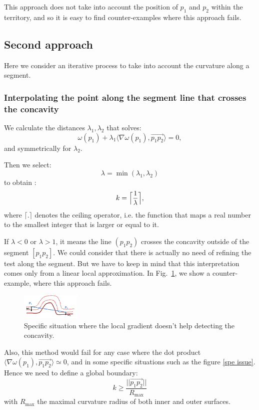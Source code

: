 \documentclass[11pt,a4paper]{article}
\newcommand{\scal}[2]{\ensuremath{\langle #1 , #2 \rangle}}
\begin{document}
This approach does not take into account the position of $p_1$ and $p_2$ within the territory, and so it is easy to find counter-examples where this approach fails.

\subsection{Second approach}

Here we consider an iterative process to take into account the curvature along a segment.

\subsubsection{Interpolating the point along the segment line that crosses the concavity} \label{subsec}
We calculate the distances $\lambda_1,\lambda_2$ that solves:
\begin{equation}
\omega (p_1) + \lambda_1 \scal{\nabla\omega(p_1)}{\overset{\rightarrow}{p_1p_2}} =  0,
\end{equation}
and symmetrically for $\lambda_2$.


Then we select:
\begin{equation}
\lambda = \min(\lambda_1, \lambda_2)
\end{equation}
to obtain :
\begin{equation}
k = \Bigl\lceil \frac{1}{\lambda} \Bigr\rceil,
\end{equation}
where $\lceil.\rceil$ denotes the ceiling operator, i.e. the function that maps a real number to the smallest integer that is larger or equal to it.

If  $\lambda < 0$ or $\lambda > 1$, it means the line $(p_1p_2)$ crosses the concavity outside of the segment $[p_1p_2]$. We could consider that there is actually no need of refining the test along the segment. But we have to keep in mind that this interpretation comes only from a linear local approximation. In Fig.~\ref{fig:cec}, we show a counter-example, where this approach fails.

\begin{figure}[h!]
			\label{spe issue}
			\centering
			\includegraphics[width=0.25\textwidth]{Drawings/CurvatureTestExample1.png}
			\caption{Specific situation where the local gradient doesn't help detecting the concavity.\label{fig:cec}}
\end{figure}
Also, this method would fail for any case where the dot product $\scal{\nabla \omega(p_1)}{\overset{\rightarrow}{p_1p_2}} \simeq 0$, and in some specific situations such as the figure \ref{spe issue}. Hence we need to define a global boundary:
\begin{equation}
k \geq \frac{||\overset{\rightarrow}{p_1p_2}||}{R_{\text{max}}}
\end{equation}
with $R_{\text{max}}$ the maximal curvature radius of both inner and outer surfaces.
\end{document}
